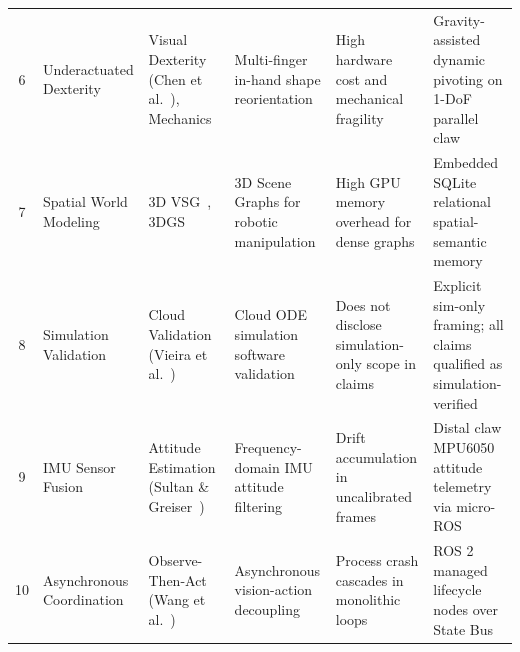 \documentclass[journal]{IEEEtran}
\begin{document}
\begin{table}[!t]
{\begin{tabular}{clllll}
6 & Underactuated Dexterity & Visual Dexterity (Chen et al.~\cite{aria_135_chen_2023_visual}), Mechanics~\cite{mason2001mechanics} & Multi-finger in-hand shape reorientation & High hardware cost and mechanical fragility & Gravity-assisted dynamic pivoting on 1-DoF parallel claw \\
7 & Spatial World Modeling & 3D VSG~\cite{aria_004_looper_2023_3d}, 3DGS~\cite{aria_002_kerbl_2023_3d} & 3D Scene Graphs for robotic manipulation & High GPU memory overhead for dense graphs & Embedded SQLite relational spatial-semantic memory \\
8 & Simulation Validation & Cloud Validation (Vieira et al.~\cite{aria_117_vieira_2025_application}) & Cloud ODE simulation software validation & Does not disclose simulation-only scope in claims & Explicit sim-only framing; all claims qualified as simulation-verified \\
9 & IMU Sensor Fusion & Attitude Estimation (Sultan \& Greiser~\cite{aria_118_team_2025_time}) & Frequency-domain IMU attitude filtering & Drift accumulation in uncalibrated frames & Distal claw MPU6050 attitude telemetry via micro-ROS \\
10 & Asynchronous Coordination & Observe-Then-Act (Wang et al.~\cite{aria_096_group_2025_observe}) & Asynchronous vision-action decoupling & Process crash cascades in monolithic loops & ROS 2 managed lifecycle nodes over State Bus \\
\bottomrule
\end{tabular}%
}
\end{table}
\end{document}
